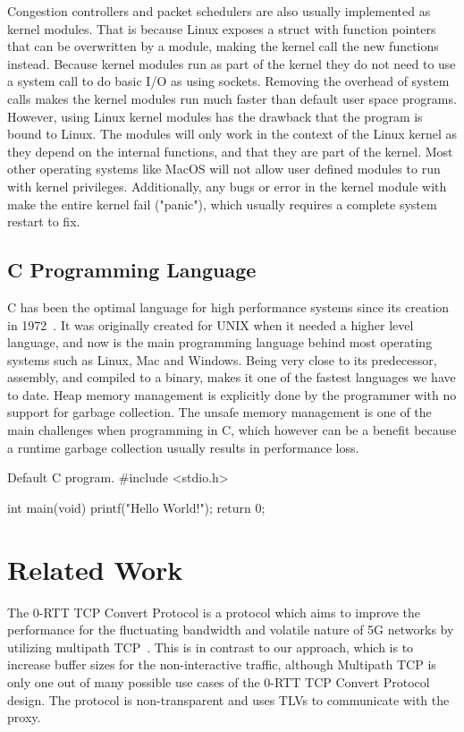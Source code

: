 \documentclass[a4paper,english, 12pt]{report}
\begin{document}
Congestion controllers and packet schedulers are also usually implemented as kernel modules. That is because Linux exposes a struct with function pointers that can be overwritten by a module, making the kernel call the new functions instead. Because kernel modules run as part of the kernel they do not need to use a system call to do basic I/O as using sockets. Removing the overhead of system calls makes the kernel modules run much faster than default user space programs.\\

However, using Linux kernel modules has the drawback that the program is bound to Linux. The modules will only work in the context of the Linux kernel as they depend on the internal functions, and that they are part of the kernel. Most other operating systems like MacOS will not allow user defined modules to run with kernel privileges. Additionally, any bugs or error in the kernel module with make the entire kernel fail ("panic"), which usually requires a complete system restart to fix.

\subsection{C Programming Language}
C has been the optimal language for high performance systems since its creation in 1972~\cite{c_programming_language}. It was originally created for UNIX when it needed a higher level language, and now is the main programming language behind most operating systems such as Linux, Mac and Windows. Being very close to its predecessor, assembly, and compiled to a binary, makes it one of the fastest languages we have to date. Heap memory management is explicitly done by the programmer with no support for garbage collection. The unsafe memory management is one of the main challenges when programming in C, which however can be a benefit because a runtime garbage collection usually results in performance loss.

\begin{autonumlstlisting}[label=lst:hello_world]{Default C program.}
#include <stdio.h>

int main(void)
{
	printf("Hello World!");
	return 0;
}

\end{autonumlstlisting}

\section{Related Work}
The 0-RTT TCP Convert Protocol is a protocol which aims to improve the performance for the fluctuating bandwidth and volatile nature of 5G networks by utilizing multipath TCP~\cite{rfc8803}. This is in contrast to our approach, which is to increase buffer sizes for the non-interactive traffic, although Multipath TCP is only one out of many possible use cases of the 0-RTT TCP Convert Protocol design. The protocol is non-transparent and uses TLVs to communicate with the proxy.\\
\end{document}
